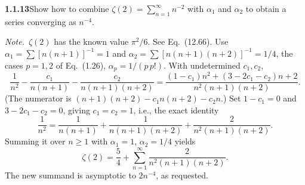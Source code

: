 \par\bigskip
\noindent\textbf{1.1.13}\quad Show how to combine
$\zeta(2)=\sum_{n=1}^{\infty}n^{-2}$ with $\alpha_{1}$ and $\alpha_{2}$ to
obtain a series converging as $n^{-4}$.

\emph{Note.}~$\zeta(2)$ has the known value $\pi^{2}/6$. See Eq.~(12.66).
\solution
Use $\alpha_1=\sum[n(n+1)]^{-1}=1$ and
$\alpha_2=\sum[n(n+1)(n+2)]^{-1}=1/4$, the cases $p=1,2$ of
Eq.~(1.26), $\alpha_p=1/(p\,p!)$. With undetermined $c_1,c_2$,
\[
 \frac1{n^2}-\frac{c_1}{n(n+1)}-\frac{c_2}{n(n+1)(n+2)}
 =\frac{(1-c_1)n^2+(3-2c_1-c_2)n+2}{n^2(n+1)(n+2)}.
\]
(The numerator is $(n+1)(n+2)-c_1n(n+2)-c_2n$.)
Set $1-c_1=0$ and $3-2c_1-c_2=0$, giving $c_1=c_2=1$, i.e., the exact
identity
\[
 \frac1{n^2}=\frac1{n(n+1)}+\frac1{n(n+1)(n+2)}+\frac2{n^2(n+1)(n+2)}.
\]
Summing it over $n\ge1$ with $\alpha_1=1$, $\alpha_2=1/4$ yields
\[
 \boxed{\zeta(2)=\frac54+\sum_{n=1}^\infty\frac2{n^2(n+1)(n+2)}}.
\]
The new summand is asymptotic to $2n^{-4}$, as requested.


